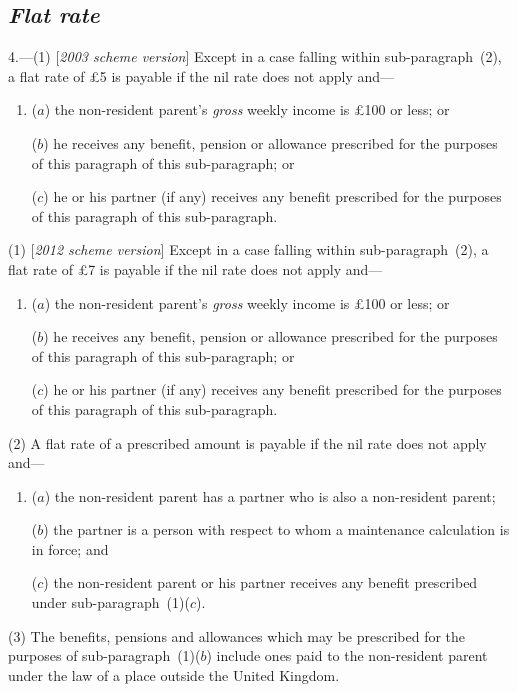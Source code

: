 \documentclass[12pt,a4paper]{article}
\begin{document}
\subsection*{\itshape Flat rate}

4.---(1) [\emph{2003 scheme version}] Except in a case falling within sub-paragraph~(2), a flat rate of £5 is payable if the nil rate does not apply and—
\begin{enumerate}\item[]
($a$) the non-resident parent’s 
\emph{gross}  %
weekly income is £100 or less; or

($b$) he receives any benefit, pension or allowance prescribed for the purposes of this paragraph of this sub-paragraph; or

($c$) he or his partner (if any) receives any benefit prescribed for the purposes of this paragraph of this sub-paragraph.
\end{enumerate}

(1) [\emph{2012 scheme version}] Except in a case falling within sub-paragraph~(2), a flat rate of 
£7  %
is payable if the nil rate does not apply and—
\begin{enumerate}\item[]
($a$) the non-resident parent’s 
\emph{gross}  %
weekly income is £100 or less; or

($b$) he receives any benefit, pension or allowance prescribed for the purposes of this paragraph of this sub-paragraph; or

($c$) he or his partner (if any) receives any benefit prescribed for the purposes of this paragraph of this sub-paragraph.
\end{enumerate}

(2) A flat rate of a prescribed amount is payable if the nil rate does not apply and—
\begin{enumerate}\item[]
($a$) the non-resident parent has a partner who is also a non-resident parent;

($b$) the partner is a person with respect to whom a maintenance calculation is in force; and

($c$) the non-resident parent or his partner receives any benefit prescribed under sub-paragraph~(1)($c$).
\end{enumerate}

(3) The benefits, pensions and allowances which may be prescribed for the purposes of sub-paragraph~(1)($b$)  include ones paid to the non-resident parent under the law of a place outside the United Kingdom.
\end{document}
